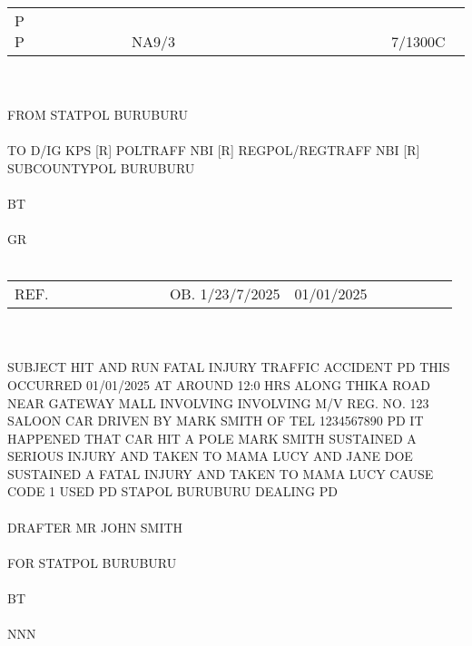 \documentclass{article}\usepackage[]{graphicx}\usepackage[]{xcolor}
\begin{document}
\noindent \\
\begin{tabular}{@{}lcr} %
P    P & ~~~~~~~~~~~~~~~~~~~~~~~ NA9/3 & ~~~~~~~~~~~~~~~~~~ 7/1300C ~ \\
\end{tabular}
\\
\\
FROM STATPOL BURUBURU  \\
\\
TO D/IG KPS [R] POLTRAFF NBI [R] REGPOL/REGTRAFF NBI [R] SUBCOUNTYPOL BURUBURU \\
\\
BT \\
\\
GR  \\
\\
\begin{tabularx}{\textwidth}{@{}lXr} %
REF. & ~~~~~~~~~~~~~~ OB. 1/23/7/2025 & 01/01/2025 ~~~~~~~~~~ \\
\end{tabularx}
\\
\\
SUBJECT HIT AND RUN FATAL INJURY TRAFFIC ACCIDENT PD THIS OCCURRED 01/01/2025 AT AROUND 12:0  HRS ALONG THIKA ROAD NEAR GATEWAY MALL INVOLVING INVOLVING M/V REG. NO. 123 SALOON CAR DRIVEN BY MARK SMITH OF TEL 1234567890 PD IT HAPPENED THAT CAR HIT A POLE MARK SMITH SUSTAINED A SERIOUS INJURY AND TAKEN TO MAMA LUCY AND JANE DOE SUSTAINED A FATAL INJURY AND TAKEN TO MAMA LUCY  CAUSE CODE 1 USED PD STAPOL BURUBURU DEALING PD \\
\\
DRAFTER MR JOHN SMITH \\
\\
FOR STATPOL BURUBURU \\
\\
BT  \\
\\
NNN  \\

\newpage
\end{document}
